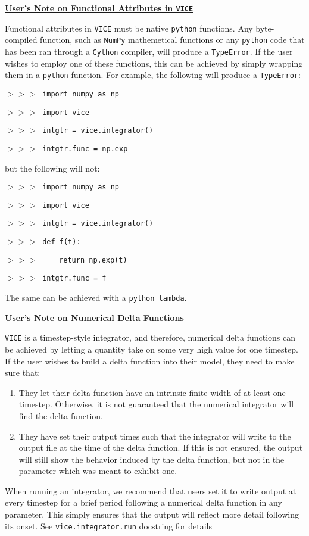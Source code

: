 \documentclass{report}
\begin{document}
\null\par\noindent
\hypertarget{note:pyfuncs}{\underline{\textbf{User's Note on Functional 
Attributes in \texttt{VICE}}}} \par\noindent 
Functional attributes in \texttt{VICE} must be native \texttt{python} 
functions. Any byte-compiled function, such as \texttt{NumPy} mathemetical 
functions or any \texttt{python} code that has been ran through a 
\texttt{Cython} compiler, will produce a \texttt{TypeError}. If the user 
wishes to employ one of these functions, this can be achieved by simply 
wrapping them in a \texttt{python} function. For example, the following will 
produce a \texttt{TypeError}: 
\par
\texttt{$>>>$ import numpy as np} \par
\texttt{$>>>$ import vice} \par
\texttt{$>>>$ intgtr = vice.integrator()} \par
\texttt{$>>>$ intgtr.func = np.exp} \par\noindent
but the following will not: \par
\texttt{$>>>$ import numpy as np} \par
\texttt{$>>>$ import vice} \par
\texttt{$>>>$ intgtr = vice.integrator()} \par 
\texttt{$>>>$ def f(t): } \par
\texttt{$>>>\qquad$ return np.exp(t) } \par
\texttt{$>>>$ intgtr.func = f} \par\noindent
The same can be achieved with a \texttt{python lambda}.  

\null\par\noindent
\hypertarget{note:delta_funcs}{\underline{\textbf{User's Note on Numerical 
Delta Functions}}} \par\noindent
\texttt{VICE} is a timestep-style integrator, and therefore, numerical delta 
functions can be  achieved by letting a quantity take on some very high value 
for one timestep. If the user wishes to build a delta function into their 
model, they need to make sure that: 
\begin{enumerate}
\item
They let their delta function have an intrinsic finite width of at least one 
timestep. Otherwise, it is not guaranteed that the numerical integrator will 
find the delta function. 

\item
They have set their output times such that the integrator will write to the 
output file at the time of the delta function. If this is not ensured, the 
output will still show the behavior induced by the delta function, but not in 
the parameter which was meant to exhibit one. 
\end{enumerate}
When running an integrator, we recommend that users set it to write output 
at every timestep for a brief period following a numerical delta function in 
any parameter. This simply ensures that the output will reflect more detail 
following its onset. See \texttt{vice.integrator.run} docstring for details 





\end{document}
